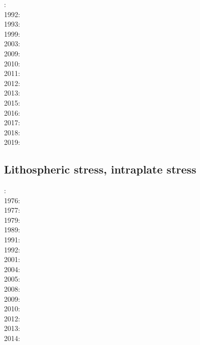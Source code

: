 {\scriptsize
{}: \cite{repa87}\\
1992: \cite{kiha92}\\
1993: \cite{gurn93}\cite{gurn93b}\\
1999: \cite{bumo99}\\
2003: \cite{cogu03}\\
2009: \cite{cohu09}\\
2010: \cite{bofb10}\cite{brau10b}\cite{stfh10}\\
2011: \cite{rapy11}\\
2012: \cite{shlm12}\cite{zhzf12}\\
2013: \cite{brrs13}\cite{flgm13}\\
2015: \cite{aupm15}\cite{kiff15}\cite{dali15}\\
2016: \cite{howa16}\\
2017: \cite{yamm17}\cite{aumh17}\\
2018: \cite{osss18}\\
2019: \cite{deli19}\cite{davk19}
}

\subsection{Lithospheric stress, intraplate stress}

{\scriptsize
{}: \cite{fouy75}\\
1976: \cite{riso76}\\
1977: \cite{chtu77}\\
1979: \cite{riso79}\\
1989: \cite{boww89}\\
1991: \cite{worg91}\\
1992: \cite{rich92}\cite{wuvr92}\cite{zoba92}\cite{clko92}\\
2001: \cite{stsm01}\\
2004: \cite{ligu04}\\
2005: \cite{timr05}\\
2008: \cite{bilr08}\cite{ghhw08}\\
2009: \cite{ghhf09}\cite{nacl09}\\
2010: \cite{bepo10}\\
2012: \cite{nalr12}\cite{ghho12}\\
2013: \cite{ghhw13}\cite{wagw13}\\
2014: \cite{vagw14}
}

